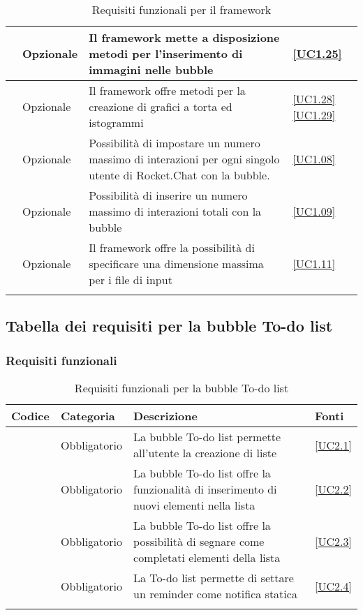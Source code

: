 \begin{longtable}{|P{1.5cm}|P{2.5cm}|P{6.5cm}|P{2.5cm}|}
	\hline \RequisitoOpF\label{L45} & Opzionale & Il framework mette a disposizione metodi per l'inserimento di immagini nelle bubble
	 & \ref{UC1.25} \\
	\hline \RequisitoOpF\label{L46} & Opzionale & Il framework offre metodi per la creazione di grafici a torta ed istogrammi
	 & \ref{UC1.28} \linebreak \ref{UC1.29}  \\	 
	 \hline \RequisitoOpF\label{L47} & Opzionale & Possibilità di impostare un numero massimo di interazioni per ogni singolo utente di Rocket.Chat con la bubble. & \ref{UC1.08} \\
	 \hline \RequisitoOpF\label{L48} & Opzionale & Possibilità di inserire un numero massimo di interazioni totali con la bubble & \ref{UC1.09} \\
	 \hline \RequisitoOpF\label{L49} & Opzionale & Il framework offre la possibilità di specificare una dimensione massima per i file di input & \ref{UC1.11} \\
	\hline
	\caption{Requisiti funzionali per il framework}
\end{longtable}


\subsection{Tabella dei requisiti per la bubble To-do list}

\subsubsection{Requisiti funzionali}

\begin{longtable}{|P{1.5cm}|P{2.5cm}|P{6.5cm}|P{2.5cm}|}
	\hline \textbf{Codice} & \textbf{Categoria} & \textbf{Descrizione} & \textbf{Fonti} \\
	\hline \RequisitoObF\label{L17} & Obbligatorio & La bubble To-do list permette all'utente la creazione di liste & \ref{UC2.1} \\
	\hline \RequisitoObF\label{L18} & Obbligatorio & La bubble To-do list offre la funzionalità di inserimento di nuovi elementi nella lista & \ref{UC2.2} \\
	\hline \RequisitoObF\label{L19} & Obbligatorio & La bubble To-do list offre la possibilità di segnare come completati elementi della lista & \ref{UC2.3} \\
	\hline \RequisitoObF\label{L20} & Obbligatorio & La To-do list permette di settare un reminder come notifica statica & \ref{UC2.4} \\
	\hline
	\caption{Requisiti funzionali per la bubble To-do list}
\end{longtable}

